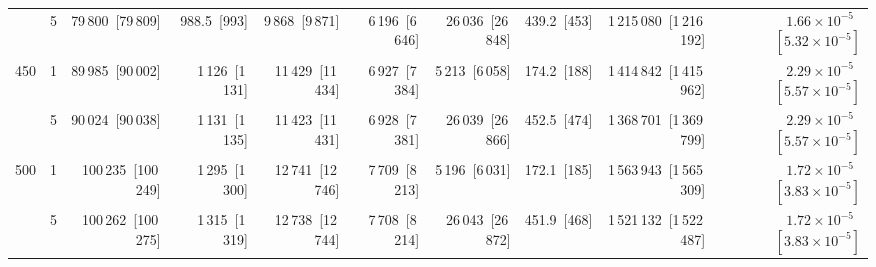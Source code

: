 \begin{tabular}{llrrrrrrrr}
 & 5 & 79\,800~{\footnotesize[79\,809]} & 988.5~{\footnotesize[993]} & 9\,868~{\footnotesize[9\,871]} & 6\,196~{\footnotesize[6\,646]} & 26\,036~{\footnotesize[26\,848]} & 439.2~{\footnotesize[453]} & 1\,215\,080~{\footnotesize[1\,216\,192]} & $1.66\!\times\!10^{-5}$~{\footnotesize $[5.32\!\times\!10^{-5}]$} \\
\cline{1-10}
\multirow[t]{2}{*}{450} & 1 & 89\,985~{\footnotesize[90\,002]} & 1\,126~{\footnotesize[1\,131]} & 11\,429~{\footnotesize[11\,434]} & 6\,927~{\footnotesize[7\,384]} & 5\,213~{\footnotesize[6\,058]} & 174.2~{\footnotesize[188]} & 1\,414\,842~{\footnotesize[1\,415\,962]} & $2.29\!\times\!10^{-5}$~{\footnotesize $[5.57\!\times\!10^{-5}]$} \\
 & 5 & 90\,024~{\footnotesize[90\,038]} & 1\,131~{\footnotesize[1\,135]} & 11\,423~{\footnotesize[11\,431]} & 6\,928~{\footnotesize[7\,381]} & 26\,039~{\footnotesize[26\,866]} & 452.5~{\footnotesize[474]} & 1\,368\,701~{\footnotesize[1\,369\,799]} & $2.29\!\times\!10^{-5}$~{\footnotesize $[5.57\!\times\!10^{-5}]$} \\
\cline{1-10}
\multirow[t]{2}{*}{500} & 1 & 100\,235~{\footnotesize[100\,249]} & 1\,295~{\footnotesize[1\,300]} & 12\,741~{\footnotesize[12\,746]} & 7\,709~{\footnotesize[8\,213]} & 5\,196~{\footnotesize[6\,031]} & 172.1~{\footnotesize[185]} & 1\,563\,943~{\footnotesize[1\,565\,309]} & $1.72\!\times\!10^{-5}$~{\footnotesize $[3.83\!\times\!10^{-5}]$} \\
 & 5 & 100\,262~{\footnotesize[100\,275]} & 1\,315~{\footnotesize[1\,319]} & 12\,738~{\footnotesize[12\,744]} & 7\,708~{\footnotesize[8\,214]} & 26\,043~{\footnotesize[26\,872]} & 451.9~{\footnotesize[468]} & 1\,521\,132~{\footnotesize[1\,522\,487]} & $1.72\!\times\!10^{-5}$~{\footnotesize $[3.83\!\times\!10^{-5}]$} \\
\cline{1-10}
\bottomrule
\end{tabular}

